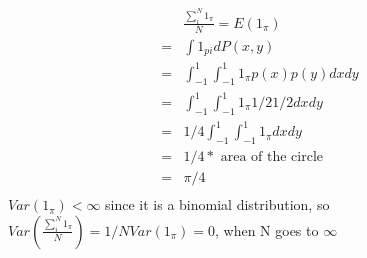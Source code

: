 \documentclass[a4paper]{article}
\begin{document}
\begin{align*}
  &\frac{ \sum_i^{N} 1_{\pi}}{N} = E(1_{\pi})\\
= &\int 1_{pi} dP(x,y)\\
= &\int_{-1}^{1} \int_{-1}^{1}  1_{\pi} p(x)p(y) dx dy\\
= &\int_{-1}^{1} \int_{-1}^{1}  1_{\pi} 1/2 1/2 dx dy\\
= & 1/4 \int_{-1}^{1} \int_{-1}^{1}  1_{\pi} dx dy\\
= & 1/4 * \textrm{ area of the circle }\\
= &\pi/4\\	
\end{align*}
$Var(1_{\pi}) < \infty$ since it is a binomial distribution, so $Var(\frac{\sum_i^{N} 1_{\pi}}{N}) =1/N Var(1_{\pi}) = 0$, when N goes to $\infty$
\end{document}
